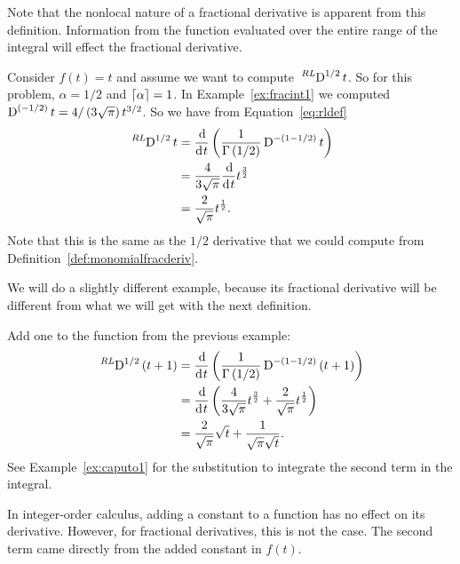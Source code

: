     \begin{remark}
      Note that the nonlocal nature of a fractional derivative is apparent from this definition. Information from the function evaluated over the entire range of the integral will effect the fractional derivative. 
      \label{rem:nonlocal}
    \end{remark}

    \begin{example}
      Consider $f(t) = t$ and assume we want to compute $\tensor*[^{RL}]{\D}{^{1/2}}t$. So for this problem, $\alpha = 1/2$
      and $\left\lceil \alpha \right\rceil = 1$.  In Example~\ref{ex:fracint1} we computed $\tensor*[]{\D}{^{(-1/2)}}t=4/\left(3 \sqrt{\pi}\right)
      t^{3/2}$. So we have from Equation~\ref{eq:rldef}
      \begin{align*}
	\tensor*[^{RL}]{\D}{^{1/2}} t &= \frac{\d}{\d t} \left( \frac{1}{\Gamma \left( 1/2 \right)} \tensor*[]{\D}{^{-(1-1/2)}} t\right)
	\\
	&=  \frac{4}{3 \sqrt{\pi}} \frac{\d}{\d t} t^\frac{3}{2} \\
	&= \frac{2}{\sqrt{\pi}} t^\frac{1}{2}.
      \end{align*}
      Note that this is the same as the $1/2$ derivative that we could compute from Definition~\ref{def:monomialfracderiv}.
      \label{ex:fracderiv1}
    \end{example}

    We will do a slightly different example, because its fractional derivative will be different from what we will get with
    the next definition.

    \begin{example}
      Add one to the function from the previous example:
      \begin{align*}
	\tensor*[^{RL}]{\D}{^{1/2}} \left( t + 1 \right) &= \frac{\d}{\d t} \left( \frac{1}{\Gamma \left( 1/2 \right)} \tensor*[]{\D}{^{-(1-1/2)}} \left( t + 1 \right) \right) \\
	&=  \frac{\d}{\d t} \left( \frac{4}{3 \sqrt{\pi}} t^\frac{3}{2} +  \frac{2}{\sqrt{\pi}} t^\frac{1}{2} \right)\\
	&= \frac{2}{\sqrt{\pi}} \sqrt{t} + \frac{1}{\sqrt{\pi} \sqrt{t}}. 
      \end{align*}
      See Example~\ref{ex:caputo1} for the substitution to integrate the second term in the integral.

      In integer-order calculus, adding a constant to a function has no effect on its derivative. However, for fractional derivatives, this is not the case. The second term came directly from the added constant in $f(t)$.       \label{ex:fracderiv2}
    \end{example}


